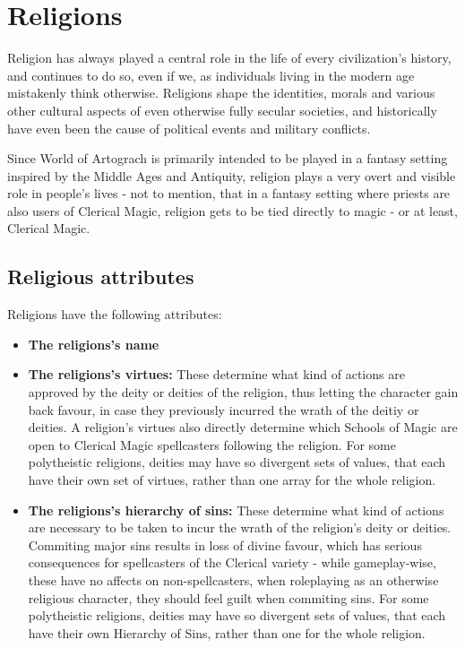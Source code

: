 \section{Religions}
Religion has always played a central role in the life of every civilization's history, and continues to do so, even if we, as individuals living in the modern age mistakenly think otherwise. Religions shape the identities, morals and various other cultural aspects of even otherwise fully secular societies, and historically have even been the cause of political events and military conflicts.

Since World of Artograch is primarily intended to be played in a fantasy setting inspired by the Middle Ages and Antiquity, religion plays a very overt and visible role in people's lives - not to mention, that in a fantasy setting where priests are also users of Clerical Magic, religion gets to be tied directly to magic - or at least, Clerical Magic.

\subsection{Religious attributes}
Religions have the following attributes:
\begin{itemize}
\item \textbf{The religions's name}
\item \textbf{The religions's virtues:} These determine what kind of actions are approved by the deity or deities of the religion, thus letting the character gain back favour, in case they previously incurred the wrath of the deitiy or deities. A religion's virtues also directly determine which Schools of Magic are open to Clerical Magic spellcasters following the religion. For some polytheistic religions, deities may have so divergent sets of values, that each have their own set of virtues, rather than one array for the whole religion.
\item \textbf{The religions's hierarchy of sins:} These determine what kind of actions are necessary to be taken to incur the wrath of the religion's deity or deities. Commiting major sins results in loss of divine favour, which has serious consequences for spellcasters of the Clerical variety - while gameplay-wise, these have no affects on non-spellcasters, when roleplaying as an otherwise religious character, they should feel guilt when commiting sins. For some polytheistic religions, deities may have so divergent sets of values, that each have their own Hierarchy of Sins, rather than one for the whole religion.
\end{itemize}
